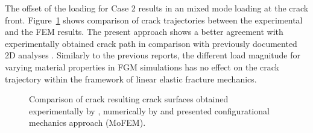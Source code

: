 \documentclass[onecolumn]{svjour3}
\begin{document}
% 
The offset of the loading for Case 2 results in an mixed mode loading at the crack front.
Figure~\ref{fig:fgm_crack_path_comapre} shows comparison of crack trajectories between the experimental and the FEM results. The present approach shows a better agreement with experimentally obtained crack path in comparison with previously documented 2D analyses \cite{kim2004simulation}. Similarly to the previous reports, the different load magnitude for varying material properties in FGM simulations has no effect on the crack trajectory within the framework of linear elastic fracture mechanics. 
% 
\begin{figure}
		\centering
		\caption{Comparison of crack resulting crack surfaces obtained experimentally by \cite{galvez1996crack}, numerically by \citep{kim2004simulation} and presented configurational mechanics approach (MoFEM).}
		\label{fig:fgm_crack_path_comapre}
\end{figure}
% 
\end{document}
